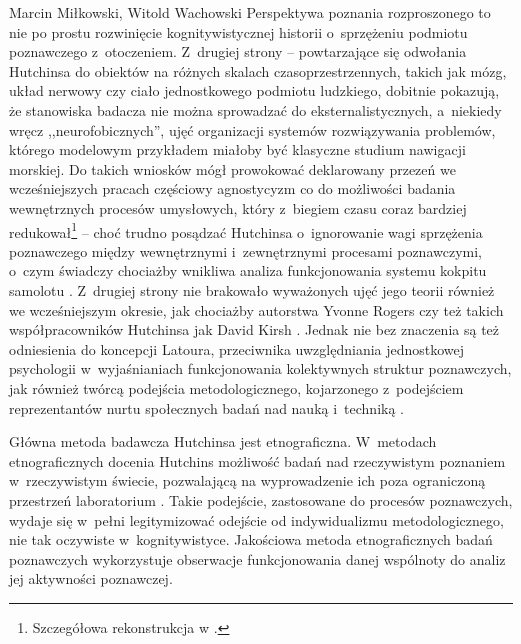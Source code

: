 \begin{artplenv2auth}{Marcin Miłkowski, Witold Wachowski}
Perspektywa poznania rozproszonego to nie po prostu rozwinięcie kognitywistycznej historii o~sprzężeniu podmiotu poznawczego z~otoczeniem. Z~drugiej strony -- powtarzające się odwołania Hutchinsa do obiektów na różnych skalach czasoprzestrzennych, takich jak mózg, układ nerwowy czy ciało jednostkowego podmiotu ludzkiego, dobitnie pokazują, że stanowiska badacza nie można sprowadzać do eksternalistycznych, a~niekiedy wręcz ,,neurofobicznych'', ujęć organizacji systemów rozwiązywania problemów, którego modelowym przykładem miałoby być klasyczne studium nawigacji morskiej. Do takich wniosków mógł prowokować deklarowany przezeń we wcześniejszych pracach częściowy agnostycyzm co do możliwości badania wewnętrznych procesów umysłowych, który z~biegiem czasu coraz bardziej redukował\footnote{Szczegółowa rekonstrukcja w
\parencites[][s.~178–188]{afeltowicz_modele_2012}[][]{afeltowicz_how_2015}.%
} -- choć trudno posądzać Hutchinsa o~ignorowanie wagi sprzężenia poznawczego między wewnętrznymi i~zewnętrznymi procesami poznawczymi, o~czym świadczy chociażby wnikliwa analiza funkcjonowania systemu kokpitu samolotu 
\parencites[zob.][]{hutchins_how_1995}[][]{engestrom_distributed_1996}. %
 Z~drugiej strony nie brakowało wyważonych ujęć jego teorii również we wcześniejszym okresie, jak chociażby autorstwa Yvonne Rogers 
\parencite*[][]{rogers_brief_1997} %
 czy też takich współpracowników Hutchinsa jak David Kirsh 
\parencite*[][]{kirsh_distributed_1999}. %
 Jednak nie bez znaczenia są też odniesienia do koncepcji Latoura, przeciwnika uwzględniania jednostkowej psychologii w~wyjaśnianiach funkcjonowania kolektywnych struktur poznawczych, jak również twórcą podejścia metodologicznego, kojarzonego z~podejściem reprezentantów nurtu społecznych badań nad nauką i~techniką 
\parencite[zob. np.][]{hess_ethnography_2001}.%


Główna metoda badawcza Hutchinsa jest etnograficzna. W~metodach etnograficznych docenia Hutchins możliwość badań nad rzeczywistym poznaniem w~rzeczywistym świecie, pozwalającą na wyprowadzenie ich poza ograniczoną przestrzeń laboratorium
\parencite[][s.~43]{hutchins_cultural_2014}. %
 Takie podejście, zastosowane do procesów poznawczych, wydaje się w~pełni legitymizować odejście od indywidualizmu metodologicznego, nie tak oczywiste w~kognitywistyce. Jakościowa metoda etnograficznych badań poznawczych wykorzystuje obserwacje funkcjonowania danej wspólnoty do analiz jej aktywności poznawczej.


\end{artplenv2auth}
